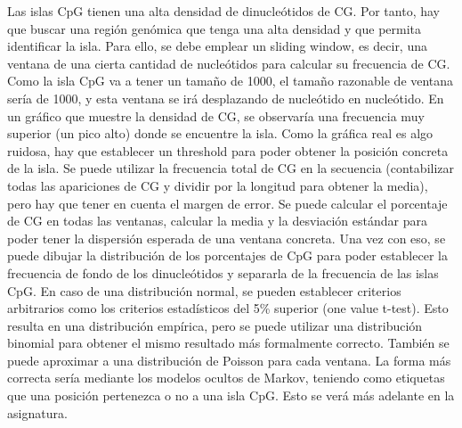 Las islas CpG tienen una alta densidad de dinucleótidos de CG. Por tanto, hay que buscar una región genómica que tenga una alta densidad y que permita identificar la isla. Para ello, se debe emplear un sliding window, es decir, una ventana de una cierta cantidad de nucleótidos para calcular su frecuencia de CG. Como la isla CpG va a tener un tamaño de 1000, el tamaño razonable de ventana sería de 1000, y esta ventana se irá desplazando de nucleótido en nucleótido. En un gráfico que muestre la densidad de CG, se observaría una frecuencia muy superior (un pico alto) donde se encuentre la isla. Como la gráfica real es algo ruidosa, hay que establecer un threshold para poder obtener la posición concreta de la isla. Se puede utilizar la frecuencia total de CG en la secuencia (contabilizar todas las apariciones de CG y dividir por la longitud para obtener la media), pero hay que tener en cuenta el margen de error. Se puede calcular el porcentaje de CG en todas las ventanas, calcular la media y la desviación estándar para poder tener la dispersión esperada de una ventana concreta. Una vez con eso, se puede dibujar la distribución de los porcentajes de CpG para poder establecer la frecuencia de fondo de los dinucleótidos y separarla de la frecuencia de las islas CpG. En caso de una distribución normal, se pueden establecer criterios arbitrarios como los criterios estadísticos del 5\% superior (one value t-test). Esto resulta en una distribución empírica, pero se puede utilizar una distribución binomial para obtener el mismo resultado más formalmente correcto. También se puede aproximar a una distribución de Poisson para cada ventana. La forma más correcta sería mediante los modelos ocultos de Markov, teniendo como etiquetas que una posición pertenezca o no a una isla CpG. Esto se verá más adelante en la asignatura. 
